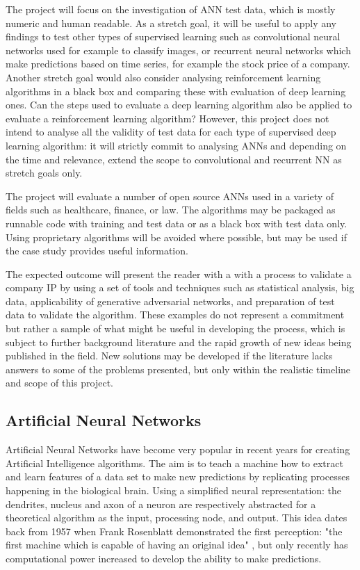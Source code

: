 \documentclass[proposal]{softeng}
\begin{document}
The project will focus on the investigation of ANN test data, which is mostly numeric and human readable. As a stretch goal, it will be useful to apply any findings to test other types of supervised learning such as convolutional neural networks used for example to classify images, or recurrent neural networks which make predictions based on time series, for example the stock price of a company. Another stretch goal would also consider analysing reinforcement learning algorithms in a black box and comparing these with evaluation of deep learning ones. Can the steps used to evaluate a deep learning algorithm also be applied to evaluate a reinforcement learning algorithm? However, this project does not intend to analyse all the validity of test data for each type of supervised deep learning algorithm: it will strictly commit to analysing ANNs and depending on the time and relevance, extend the scope to convolutional and recurrent NN as stretch goals only.

The project will evaluate a number of open source ANNs used in a variety of fields such as healthcare, finance, or law. The algorithms may be packaged as runnable code with training and test data or as a black box with test data only. Using proprietary algorithms will be avoided where possible, but may be used if the case study provides useful information. 

The expected outcome will present the reader with a with a process to validate a company IP by using a set of tools and techniques such as statistical analysis, big data, applicability of generative adversarial networks, and preparation of test data to validate the algorithm.  These examples do not represent a commitment but rather a sample of what might be useful in developing the process, which  is subject to further background literature and the rapid growth of new ideas being published in the field. New solutions may be developed if the literature lacks answers to some of the problems presented, but only within the realistic timeline and scope of this project.


\subsection{Artificial Neural Networks}

Artificial Neural Networks have become very popular in recent years for creating Artificial Intelligence algorithms. The aim is to teach a machine how to extract and learn features of a data set to make new predictions by replicating processes happening in the biological brain. Using a simplified neural representation: the dendrites, nucleus and axon of a neuron are respectively abstracted for a theoretical algorithm as the input, processing node, and output. This idea dates back from 1957 when Frank Rosenblatt demonstrated the first perception: "the first machine which is capable of having an original idea" \cite{rosenblatt}, but only recently has computational  power increased to develop the ability to make predictions.
\end{document}
